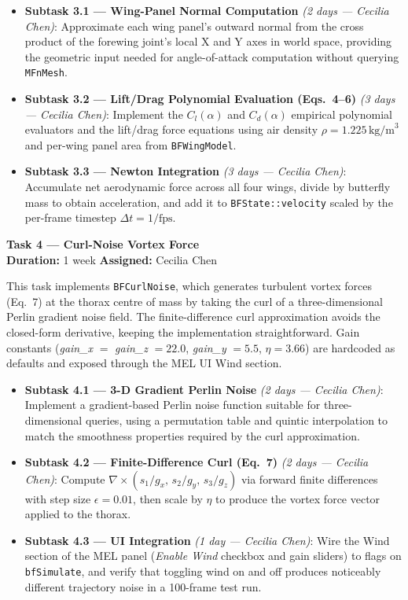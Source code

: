 \documentclass[12pt]{article}
\begin{document}
\begin{itemize}
  \item \textbf{Subtask 3.1 --- Wing-Panel Normal Computation} \textit{(2 days --- Cecilia Chen)}: Approximate each
    wing panel's outward normal from the cross product of the forewing joint's local
    X and Y axes in world space, providing the geometric input needed for
    angle-of-attack computation without querying \texttt{MFnMesh}.
  \item \textbf{Subtask 3.2 --- Lift/Drag Polynomial Evaluation (Eqs.~4--6)} \textit{(3 days --- Cecilia Chen)}:
    Implement the $C_l(\alpha)$ and $C_d(\alpha)$ empirical polynomial evaluators
    and the lift/drag force equations using air density $\rho=1.225\,\text{kg/m}^3$
    and per-wing panel area from \texttt{BFWingModel}.
  \item \textbf{Subtask 3.3 --- Newton Integration} \textit{(3 days --- Cecilia Chen)}: Accumulate net aerodynamic
    force across all four wings, divide by butterfly mass to obtain acceleration,
    and add it to \texttt{BFState::velocity} scaled by the per-frame timestep
    $\Delta t = 1/\text{fps}$.
\end{itemize}

\bigskip
\noindent\textbf{Task 4 --- Curl-Noise Vortex Force}\\
\textbf{Duration:} 1 week \quad \textbf{Assigned:} Cecilia Chen

This task implements \texttt{BFCurlNoise}, which generates turbulent vortex forces
(Eq.~7) at the thorax centre of mass by taking the curl of a three-dimensional
Perlin gradient noise field. The finite-difference curl approximation avoids the
closed-form derivative, keeping the implementation straightforward. Gain constants
(\textit{gain\_x} $=$ \textit{gain\_z} $= 22.0$, \textit{gain\_y} $= 5.5$,
$\eta = 3.66$) are hardcoded as defaults and exposed through the MEL UI Wind section.

\begin{itemize}
  \item \textbf{Subtask 4.1 --- 3-D Gradient Perlin Noise} \textit{(2 days --- Cecilia Chen)}: Implement a
    gradient-based Perlin noise function suitable for three-dimensional queries,
    using a permutation table and quintic interpolation to match the smoothness
    properties required by the curl approximation.
  \item \textbf{Subtask 4.2 --- Finite-Difference Curl (Eq.~7)} \textit{(2 days --- Cecilia Chen)}: Compute
    $\nabla \times (s_1/g_x,\, s_2/g_y,\, s_3/g_z)$ via forward finite differences
    with step size $\epsilon = 0.01$, then scale by $\eta$ to produce the vortex
    force vector applied to the thorax.
  \item \textbf{Subtask 4.3 --- UI Integration} \textit{(1 day --- Cecilia Chen)}: Wire the Wind section of the MEL
    panel (\textit{Enable Wind} checkbox and gain sliders) to flags on
    \texttt{bfSimulate}, and verify that toggling wind on and off produces
    noticeably different trajectory noise in a 100-frame test run.
\end{itemize}
\end{document}
